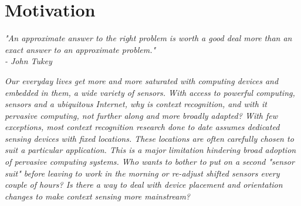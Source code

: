 \chapter{Motivation}

\begin{flushright} 
\textit{"An approximate answer to the 
right problem is worth a good deal more 
than an exact answer to an approximate problem." \\
- John Tukey}\end{flushright} 
\begingroup
\textit{Our everyday lives get more and more saturated with computing devices and embedded in them, a wide variety of sensors. With access to powerful computing, sensors and a ubiquitous Internet, why is context recognition, and with it pervasive computing, not further along and more broadly adapted? With few exceptions, most context recognition research done to date assumes dedicated sensing devices with fixed locations. These locations are often carefully chosen to suit a particular application. This is a major limitation hindering broad adoption of pervasive computing systems. Who wants to bother to put on a second "sensor suit" before leaving to work in the morning or re-adjust shifted sensors every couple of hours? Is there a way to deal with device placement and orientation changes to make context sensing more mainstream?}
